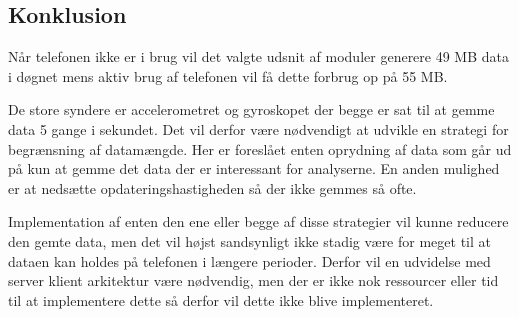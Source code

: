 \subsection{Konklusion}
Når telefonen ikke er i brug vil det valgte udsnit af moduler generere 49 MB data i døgnet mens aktiv brug af telefonen vil få dette forbrug op på 55 MB.

De store syndere er accelerometret og gyroskopet der begge er sat til at gemme data 5 gange i sekundet.
Det vil derfor være nødvendigt at udvikle en strategi for begrænsning af datamængde.
Her er foreslået enten oprydning af data som går ud på kun at gemme det data der er interessant for analyserne.
En anden mulighed er at nedsætte opdateringshastigheden så der ikke gemmes så ofte.

Implementation af enten den ene eller begge af disse strategier vil kunne reducere den gemte data, men det vil højst sandsynligt ikke stadig være for meget til at dataen kan holdes på telefonen i længere perioder.
Derfor vil en udvidelse med server klient arkitektur være nødvendig, men der er ikke nok ressourcer eller tid til at implementere dette så derfor vil dette ikke blive implementeret.